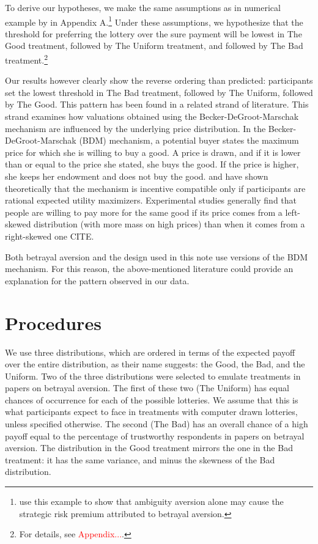To derive our hypotheses, we make the same assumptions as in numerical example by \cite{Li2020a} in Appendix A.\footnote{
\cite{Li2020a} use this example to show that ambiguity aversion alone may cause the strategic risk premium attributed to betrayal aversion.
}
Under these assumptions, we hypothesize that the threshold for preferring the lottery over the sure payment will be lowest in The Good treatment, followed by The Uniform treatment, and followed by The Bad treatment.\footnote{
For details, see \textcolor{red}{Appendix...}.}

Our results however clearly show the reverse ordering than predicted: participants set the lowest threshold in The Bad treatment, followed by The Uniform, followed by The Good.
This pattern has been found in a related strand of literature.
This strand examines how valuations obtained using the Becker-DeGroot-Marschak mechanism \citep{Becker1964} are influenced by the underlying price distribution.
In the Becker-DeGroot-Marschak (BDM) mechanism, a potential buyer states the maximum price for which she is willing to buy a good.
A price is drawn, and if it is lower than or equal to the price she stated, she buys the good.
If the price is higher, she keeps her endowment and does not buy the good.
\cite{Karni1987} and \cite{Horowitz2006} have shown theoretically that the mechanism is incentive compatible only if participants are rational expected utility maximizers.
Experimental studies generally find that people are willing to pay more for the same good if its price comes from a left-skewed distribution (with more mass on high prices) than when it comes from a right-skewed one CITE.

Both betrayal aversion and the design used in this note use versions of the BDM mechanism.
For this reason, the above-mentioned literature could provide an explanation for the pattern observed in our data.


\section{Procedures}\label{sec:proced}
We use three distributions, which are ordered in terms of the expected payoff over the entire distribution, as their name suggests: the Good, the Bad, and the Uniform.
Two of the three distributions were selected to emulate treatments in papers on betrayal aversion.
The first of these two (The Uniform) has equal chances of occurrence for each of the possible lotteries.
We assume that this is what participants expect to face in treatments with computer drawn lotteries, unless specified otherwise.
The second (The Bad) has an overall chance of a high payoff equal to the percentage of trustworthy respondents in papers on betrayal aversion.
The distribution in the Good treatment mirrors the one in the Bad treatment: it has the same variance, and minus the skewness of the Bad distribution.

